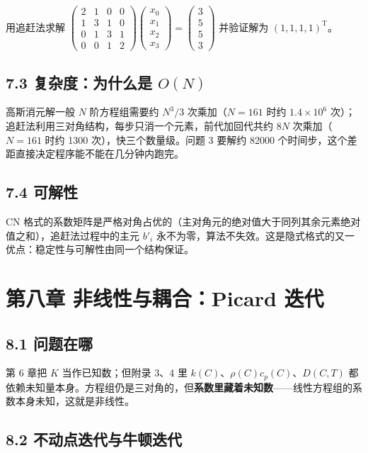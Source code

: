 \documentclass[12pt,a4paper]{ctexart}
\newcommand{\handon}[1]{\par\smallskip\noindent{\heiti 【手推练习】}#1\par\smallskip}
\begin{document}
\handon{用追赶法求解
$
\begin{pmatrix}2&1&0&0\\1&3&1&0\\0&1&3&1\\0&0&1&2\end{pmatrix}
\begin{pmatrix}x_0\\x_1\\x_2\\x_3\end{pmatrix}
=\begin{pmatrix}3\\5\\5\\3\end{pmatrix}
$
并验证解为 $(1,1,1,1)^{\mathrm{T}}$。}

\subsection{7.3 复杂度：为什么是 $O(N)$}

高斯消元解一般 $N$ 阶方程组需要约 $N^3/3$ 次乘加（$N=161$ 时约 $1.4\times10^6$ 次）；追赶法利用三对角结构，每步只消一个元素，前代加回代共约 $8N$ 次乘加（$N=161$ 时约 1300 次），快三个数量级。问题 3 要解约 82000 个时间步，这个差距直接决定程序能不能在几分钟内跑完。

\subsection{7.4 可解性}

CN 格式的系数矩阵是严格对角占优的（主对角元的绝对值大于同列其余元素绝对值之和），追赶法过程中的主元 $b'_i$ 永不为零，算法不失效。这是隐式格式的又一优点：稳定性与可解性由同一个结构保证。

\section{第八章 非线性与耦合：Picard 迭代}

\subsection{8.1 问题在哪}

第 6 章把 $K$ 当作已知数；但附录 3、4 里 $k(C)$、$\rho(C)c_p(C)$、$D(C,T)$ 都依赖未知量本身。方程组仍是三对角的，但\textbf{系数里藏着未知数}——线性方程组的系数本身未知，这就是非线性。

\subsection{8.2 不动点迭代与牛顿迭代}
\end{document}
